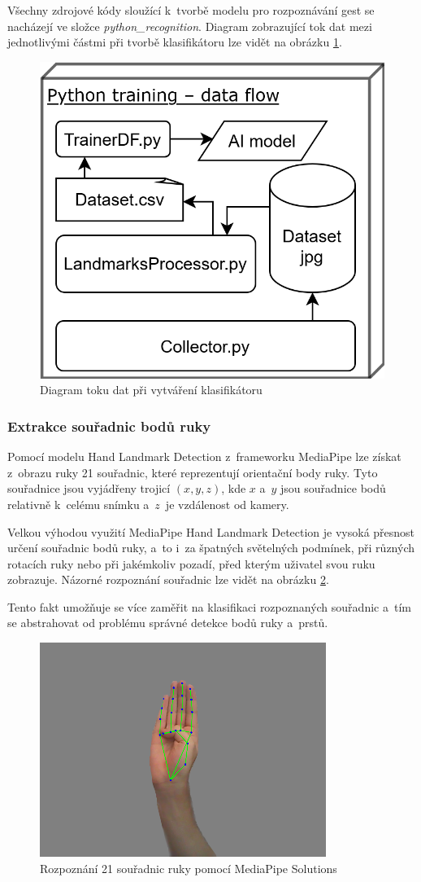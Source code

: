 \documentclass[
  master,
  program=ainfvs,
  biblatex,
  figures=true,
  tables=false,
  sourcecodes=true,
  glossaries,
  index
]{kidiplom}
\begin{document}
        Všechny zdrojové kódy sloužící k~tvorbě modelu pro rozpoznávání gest se nacházejí ve složce \emph{python\_recognition}. Diagram zobrazující tok dat mezi jednotlivými částmi při tvorbě klasifikátoru lze vidět na obrázku \ref{python-training-flow-diagram}.

        \begin{figure}[htbp]
            \centering
            \includegraphics[width=0.5\columnwidth]{graphics/python-training-flow-diagram.png}
            \caption{Diagram toku dat při vytváření klasifikátoru}
            \label{python-training-flow-diagram}
        \end{figure}
        
        \subsubsection{Extrakce souřadnic bodů ruky}
           Pomocí modelu Hand Landmark Detection z~frameworku MediaPipe lze získat z~obrazu ruky 21 souřadnic, které reprezentují orientační body ruky. Tyto souřadnice jsou vyjádřeny trojicí $(x, y, z)$, kde $x$ a~$y$ jsou souřadnice bodů relativně k~celému snímku a~$z$~je vzdálenost od kamery.

           Velkou výhodou využití MediaPipe Hand Landmark Detection je vysoká přesnost určení souřadnic bodů ruky, a~to i~za špatných světelných podmínek, při různých rotacích ruky nebo při jakémkoliv pozadí, před kterým uživatel svou ruku zobrazuje. Názorné rozpoznání souřadnic lze vidět na obrázku \ref{mediapipe}.
           
           Tento fakt umožňuje se více zaměřit na klasifikaci rozpoznaných souřadnic a~tím se abstrahovat od problému správné detekce bodů ruky a~prstů.

         \begin{figure}[htbp]
            \centering
            \includegraphics[width=0.5\columnwidth]{graphics/mediapipe.png}
            \caption{Rozpoznání 21 souřadnic ruky pomocí MediaPipe Solutions}
            \label{mediapipe}
        \end{figure}
           
\end{document}
